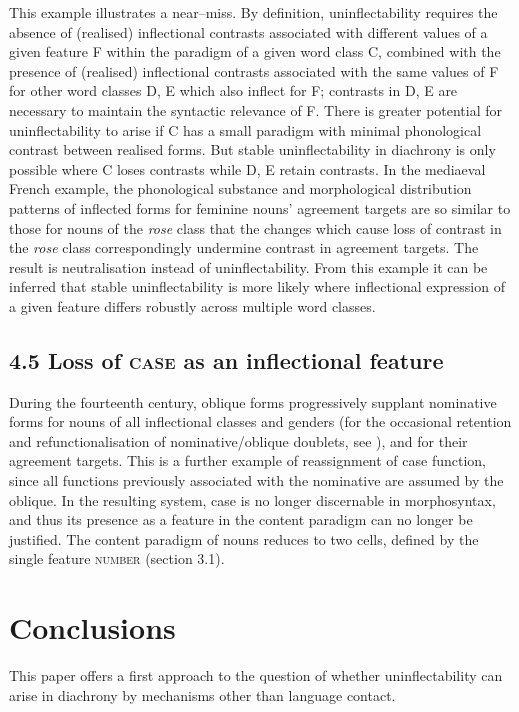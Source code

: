 \documentclass[output=paper]{langscibook}
\begin{document}
This example illustrates a near–miss. By definition, uninflectability requires the absence of (realised) inflectional contrasts associated with different values of a given feature F within the paradigm of a given word class C, combined with the presence of (realised) inflectional contrasts associated with the same values of F for other word classes D, E which also inflect for F; contrasts in D, E are necessary to maintain the syntactic relevance of F. There is greater potential for uninflectability to arise if C has a small paradigm with minimal phonological contrast between realised forms. But stable uninflectability in diachrony is only possible where C loses contrasts while D, E retain contrasts. In the mediaeval French example, the phonological substance and morphological distribution patterns of inflected forms for feminine nouns’ agreement targets are so similar to those for nouns of the \textit{rose} class that the changes which cause loss of contrast in the \textit{rose} class correspondingly undermine contrast in agreement targets. The result is neutralisation instead of uninflectability. From this example it can be inferred that stable uninflectability is more likely where inflectional expression of a given feature differs robustly across multiple word classes.

\subsection{4.5 Loss of \textsc{case} as an inflectional feature}

During the fourteenth century, oblique forms progressively supplant nominative forms for nouns of all inflectional classes and genders (for the occasional retention and refunctionalisation of nominative/oblique doublets, see \citealt{Smith2011}), and for their agreement targets. This is a further example of reassignment of case function, since all functions previously associated with the nominative are assumed by the oblique. In the resulting system, case is no longer discernable in morphosyntax, and thus its presence as a feature in the content paradigm can no longer be justified. The content paradigm of nouns reduces to two cells, defined by the single feature \textsc{number} (section 3.1).

\section{Conclusions}

This paper offers a first approach to the question of whether uninflectability can arise in diachrony by mechanisms other than language contact. 
\end{document}
